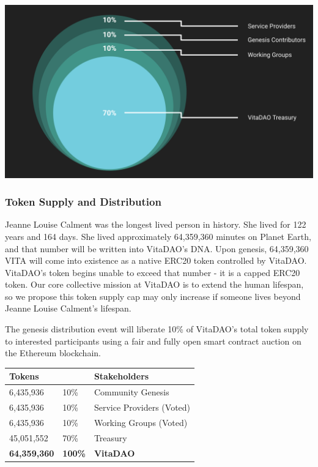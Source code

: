 \documentclass[10pt,letterpaper]{article}
\begin{document}
\vspace{15pt}
\begin{center}
\includegraphics[width=\linewidth]{images/Initial Token Allocation.png} 
\end{center}

\subsubsection{Token Supply and Distribution}
Jeanne Louise Calment was the longest lived person in history. She lived for 122 years and 164 days. She lived approximately 64,359,360 minutes on Planet Earth, and that number will be written into  VitaDAO’s DNA. Upon genesis, 64,359,360 VITA will come into existence as a native ERC20 token controlled by VitaDAO. VitaDAO’s token begins unable to exceed that number - it is a capped ERC20 token. Our core collective mission at VitaDAO is to extend the human lifespan, so we propose this token supply cap may only increase if someone lives beyond Jeanne Louise Calment's lifespan.

The genesis distribution event will liberate 10\% of VitaDAO's total token supply to interested participants using a fair and fully open smart contract auction on the Ethereum blockchain.

\begin{table}[h!]
  \begin{center}
    \setlength{\extrarowheight}{5pt}
	\begin{tabular}{p{}p{}p{}}
		\textbf{Tokens} & & \textbf{Stakeholder}s \\ 
		\hline
		6,435,936 & 10\% & Community Genesis \\ 
		6,435,936 & 10\% & Service Providers (Voted) \\ 
		6,435,936 & 10\% & Working Groups (Voted) \\ 
		45,051,552 & 70\% & Treasury \\ 
		\hline 
		\textbf{64,359,360} & \textbf{100\%} & \textbf{VitaDAO} \\ 
		\hline 
	\end{tabular} 
  \end{center}
\end{table}
\end{document}
